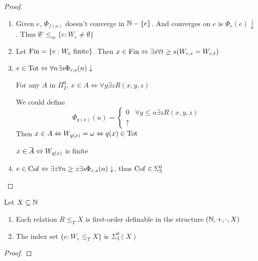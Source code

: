 \documentclass[11pt]{article}
\begin{document}
\begin{proof}
\begin{enumerate}
\item Given \(e\), \(\Phi_{f(n)}\) doesn't converge in \(\mathbb{N}-\{e\}\). And converges on \(e\)
is \(\Phi_e(e)\downarrow\). Thus \(\emptyset'\le_m\{e:W_e\neq\emptyset\}\)
\item Let \(\operatorname{Fin}=\{e:W_e\text{ finite}\}\). Then \(x\in\operatorname{Fin}\Leftrightarrow\exists s\forall t\ge s(W_{e,s}=W_{e,t})\)
\item \(e\in\operatorname{Tot}\Leftrightarrow\forall n\exists s\Phi_{e,s}(n)\downarrow\)

For any \(A\) in \(\Pi_2^0\), \(x\in A\Leftrightarrow\forall y\exists zR(x,y,z)\)

We could define
\begin{equation*}
\Phi_{q(x)}(u)=
\begin{cases}
0&\forall y\le u\exists zR(x,y,z)\\
\uparrow
\end{cases}
\end{equation*}
Then \(x\in A\Leftrightarrow W_{q(x)}=\omega\Leftrightarrow q(x)\in\operatorname{Tot}\)

\(x\in\barA\Leftrightarrow W_{q(x)}\) is finite
\item \(e\in\operatorname{Cof}\Leftrightarrow\exists z\forall n\ge z\exists s\Phi_{e,s}(n)\downarrow\), thus \(\operatorname{Cof}\in\Sigma_3^0\)
\end{enumerate}
\end{proof}

\begin{exercise}
\label{1.4.24}
Let \(X\subseteq\mathbb{N}\)
\begin{enumerate}
\item Each relation \(R\le_TX\) is first-order definable in the structure \((\mathbb{N},+,\cdot ,X)\)
\item The index set \(\{e:W_e\le_TX\}\) is \(\Sigma_3^0(X)\)
\end{enumerate}
\end{exercise}

\begin{proof}

\end{proof}
\end{document}
